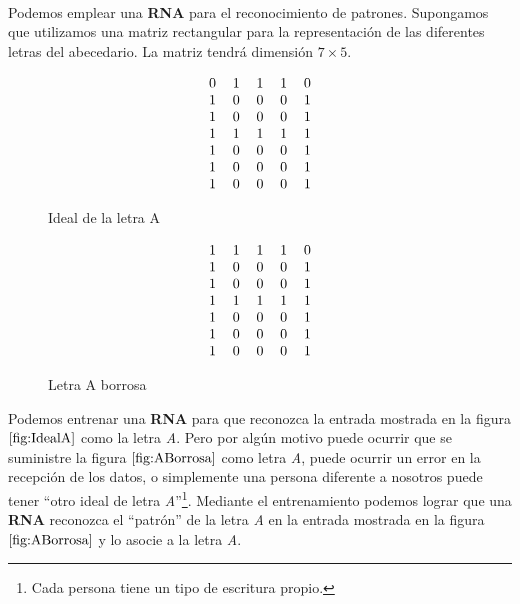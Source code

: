 \begin{ejemplo} \label{ej:OCRSimple}\ \\
Podemos emplear una \textbf{RNA} para el reconocimiento de
patrones. Supongamos que utilizamos una matriz rectangular para la
representaci\'on de las diferentes letras del abecedario. La matriz tendr\'a
dimensi\'on $7\times 5$.
%
\newpage
%
\begin{figure}[!ht]
\begin{displaymath}
\begin{tabular}{ccccc}
0&1&1&1&0\\
1&0&0&0&1\\
1&0&0&0&1\\
1&1&1&1&1\\
1&0&0&0&1\\
1&0&0&0&1\\
1&0&0&0&1
\end{tabular}
\end{displaymath}
\caption{Ideal de la letra A} \label{fig:IdealA}
\end{figure}
\begin{figure}[!ht]
\begin{displaymath}
\begin{tabular}{ccccc}
1&1&1&1&0\\
1&0&0&0&1\\
1&0&0&0&1\\
1&1&1&1&1\\
1&0&0&0&1\\
1&0&0&0&1\\
1&0&0&0&1
\end{tabular}
\end{displaymath}
\caption{Letra A borrosa} \label{fig:ABorrosa}
\end{figure}

Podemos entrenar una \textbf{RNA} para que reconozca la entrada mostrada en la
figura $\ref{fig:IdealA}$ como la letra \emph{A}. Pero por alg\'un motivo puede
ocurrir que se suministre la figura $\ref{fig:ABorrosa}$ como letra \emph{A},
puede ocurrir un error en la recepci\'on de los datos, o simplemente una
persona diferente a nosotros puede tener ``otro ideal de letra
\emph{A}''\footnote{Cada persona tiene un tipo de escritura propio.}. Mediante
el entrenamiento podemos lograr que una \textbf{RNA} reconozca el ``patr\'on''
de la letra \emph{A} en la entrada mostrada en la figura $\ref{fig:ABorrosa}$ y
lo asocie a la letra \emph{A}.
\end{ejemplo}

